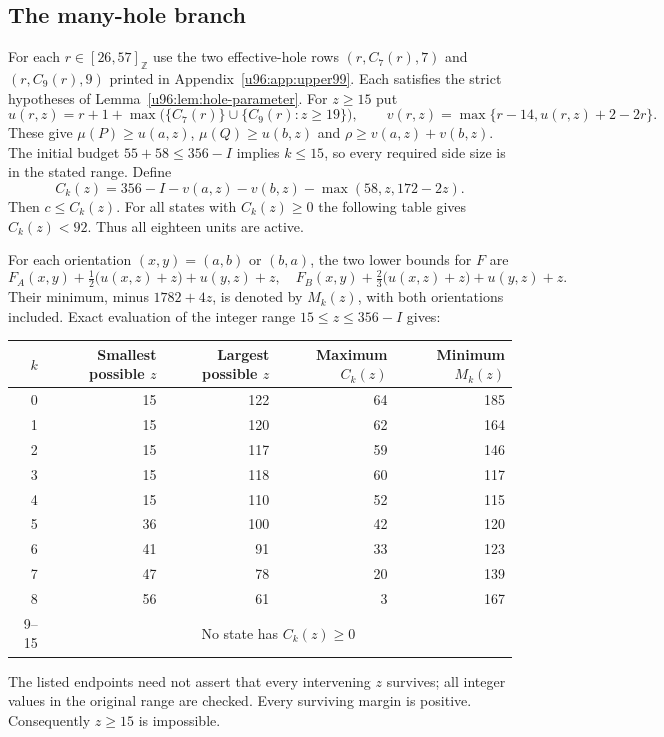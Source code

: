 \documentclass[11pt,a4paper]{article}
\theoremstyle{remark}
\begin{document}
\subsection{The many-hole branch}
For each $r\in[26,57]_{\mathbb Z}$ use the two effective-hole rows
$(r,C_7(r),7)$ and $(r,C_9(r),9)$ printed in
Appendix~\ref{u96:app:upper99}. Each satisfies the strict hypotheses of
Lemma~\ref{u96:lem:hole-parameter}. For $z\geq15$ put
\[
 u(r,z)=r+1+\max\bigl(\{C_7(r)\}\cup
       \{C_9(r):z\geq19\}\bigr),\qquad
 v(r,z)=\max\{r-14,u(r,z)+2-2r\}.
\]
These give $\mu(P)\geq u(a,z)$, $\mu(Q)\geq u(b,z)$ and
$\rho\geq v(a,z)+v(b,z)$. The initial budget
$55+58\leq356-I$ implies $k\leq15$, so every required side size is in
the stated range. Define
\[
 C_k(z)=356-I-v(a,z)-v(b,z)-\max(58,z,172-2z).
\]
Then $c\leq C_k(z)$. For all states with $C_k(z)\geq0$ the following table
gives $C_k(z)<92$. Thus all eighteen units are active.

For each orientation $(x,y)=(a,b)$ or $(b,a)$, the two lower bounds for $F$
are
\[
 F_A(x,y)+\tfrac12\bigl(u(x,z)+z\bigr)+u(y,z)+z,
 \quad F_B(x,y)+\tfrac23\bigl(u(x,z)+z\bigr)+u(y,z)+z.
\]
Their minimum, minus $1782+4z$, is denoted by $M_k(z)$, with both
orientations included. Exact evaluation of the integer range
$15\leq z\leq356-I$ gives:
\begin{center}\small
\begin{tabular}{rrrrr}
\toprule
$k$&Smallest possible $z$&Largest possible $z$&Maximum $C_k(z)$&Minimum $M_k(z)$\\
\midrule
0&15&122&64&185\\
1&15&120&62&164\\
2&15&117&59&146\\
3&15&118&60&117\\
4&15&110&52&115\\
5&36&100&42&120\\
6&41&91&33&123\\
7&47&78&20&139\\
8&56&61&3&167\\
9--15&\multicolumn{4}{c}{No state has $C_k(z)\geq0$}\\
\bottomrule
\end{tabular}
\end{center}
The listed endpoints need not assert that every intervening $z$ survives;
all integer values in the original range are checked. Every surviving
margin is positive. Consequently $z\geq15$ is impossible.
\end{document}
